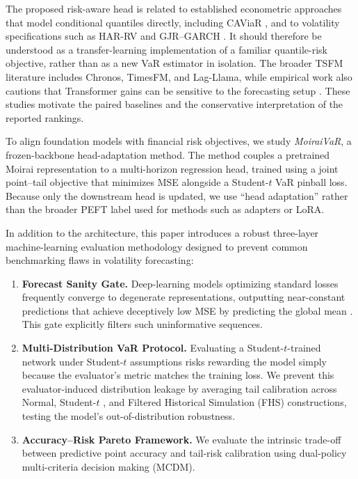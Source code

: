 \documentclass[runningheads]{llncs}
\begin{document}
The proposed risk-aware head is related to established econometric approaches that model conditional quantiles directly, including CAViaR \cite{ref17}, and to volatility specifications such as HAR-RV \cite{ref18} and GJR--GARCH \cite{ref19}. It should therefore be understood as a transfer-learning implementation of a familiar quantile-risk objective, rather than as a new VaR estimator in isolation. The broader TSFM literature includes Chronos, TimesFM, and Lag-Llama, while empirical work also cautions that Transformer gains can be sensitive to the forecasting setup \cite{ref20,ref21,ref22,ref23}. These studies motivate the paired baselines and the conservative interpretation of the reported rankings.

To align foundation models with financial risk objectives, we study \textit{MoiraiVaR}, a frozen-backbone head-adaptation method. The method couples a pretrained Moirai representation to a multi-horizon regression head, trained using a joint point--tail objective that minimizes MSE alongside a Student-$t$ VaR pinball loss. Because only the downstream head is updated, we use ``head adaptation'' rather than the broader PEFT label used for methods such as adapters or LoRA.

In addition to the architecture, this paper introduces a robust three-layer machine-learning evaluation methodology designed to prevent common benchmarking flaws in volatility forecasting:

\begin{enumerate}
\item \textbf{Forecast Sanity Gate.} Deep-learning models optimizing standard losses frequently converge to degenerate representations, outputting near-constant predictions that achieve deceptively low MSE by predicting the global mean \cite{ref2}. This gate explicitly filters such uninformative sequences.
\item \textbf{Multi-Distribution VaR Protocol.} Evaluating a Student-$t$-trained network under Student-$t$ assumptions risks rewarding the model simply because the evaluator's metric matches the training loss. We prevent this evaluator-induced distribution leakage by averaging tail calibration across Normal, Student-$t$ \cite{ref10}, and Filtered Historical Simulation (FHS) \cite{ref11} constructions, testing the model's out-of-distribution robustness.
\item \textbf{Accuracy--Risk Pareto Framework.} We evaluate the intrinsic trade-off between predictive point accuracy and tail-risk calibration using dual-policy multi-criteria decision making (MCDM).
\end{enumerate}
\end{document}

